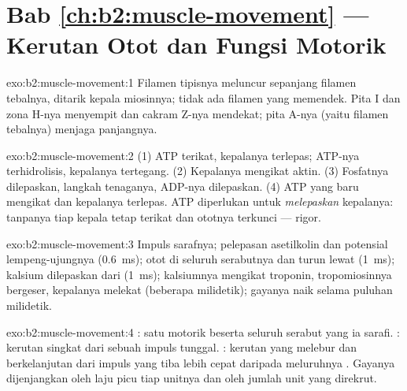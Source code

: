 \section*{Bab \ref{ch:b2:muscle-movement} --- Kerutan Otot dan Fungsi Motorik}

\begin{solution}{exo:b2:muscle-movement:1}
Filamen tipisnya meluncur sepanjang filamen tebalnya, ditarik kepala
miosinnya; tidak ada filamen yang memendek. Pita I dan zona H-nya
menyempit dan cakram Z-nya mendekat; pita A-nya (yaitu filamen
tebalnya) menjaga panjangnya.
\end{solution}

\begin{solution}{exo:b2:muscle-movement:2}
(1) ATP terikat, kepalanya terlepas; ATP-nya terhidrolisis, kepalanya
tertegang. (2) Kepalanya mengikat aktin. (3) Fosfatnya dilepaskan,
langkah tenaganya, ADP-nya dilepaskan. (4) ATP yang baru mengikat dan
kepalanya terlepas. ATP diperlukan untuk \emph{melepaskan} kepalanya:
tanpanya tiap kepala tetap terikat dan ototnya terkunci --- rigor.
\end{solution}

\begin{solution}{exo:b2:muscle-movement:3}
Impuls sarafnya; pelepasan asetilkolin dan potensial lempeng-ujungnya
(\qty{0.6}{ms});  otot di seluruh serabutnya dan turun
lewat  (\qty{1}{ms}); kalsium dilepaskan dari  (\qty{1}{ms}); kalsiumnya mengikat troponin,
tropomiosinnya bergeser, kepalanya melekat (beberapa milidetik);
gayanya naik selama puluhan milidetik.
\end{solution}

\begin{solution}{exo:b2:muscle-movement:4}
: satu  motorik beserta seluruh serabut yang ia
sarafi. : kerutan singkat dari sebuah impuls tunggal. :
kerutan yang melebur dan berkelanjutan dari impuls yang tiba lebih
cepat daripada meluruhnya . Gayanya dijenjangkan oleh laju
picu tiap unitnya dan oleh jumlah unit yang direkrut.
\end{solution}

